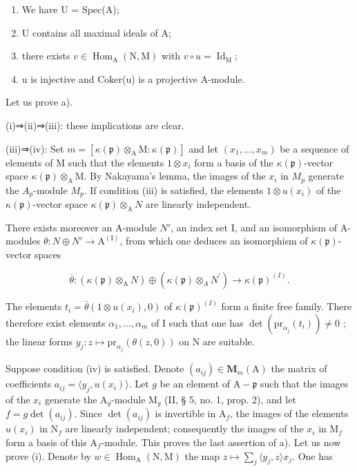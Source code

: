 \begin{enumerate}
\def\labelenumi{(\roman{enumi})}
\item
  We have U = Spec(A);
\item
  U contains all maximal ideals of A;
\item
  there exists \(v \in \operatorname{Hom}_{\mathrm{A}}(\mathrm{N}, \mathrm{M})\) with \(v \circ u = \operatorname{Id}_{\mathrm{M}}\);
\item
  u is injective and Coker(u) is a projective A-module.
\end{enumerate}

Let us prove a).

(i)⇒(ii)⇒(iii): these implications are clear.

(iii)⇒(iv): Set \(m = [\kappa(\mathfrak{p}) \otimes_{\mathrm{A}} \mathrm{M} : \kappa(\mathfrak{p})]\) and let \((x_{1}, \ldots, x_{m})\) be a sequence of elements of M such that the elements \(1 \otimes x_{i}\) form a basis of the \(\kappa(\mathfrak{p})\)-vector space \(\kappa(\mathfrak{p}) \otimes_{\mathrm{A}} \mathrm{M}\). By Nakayama's lemma, the images of the \(x_{i}\) in \(M_{p}\) generate the \(A_{p}\)-module \(M_{p}\). If condition (iii) is satisfied, the elements \(1 \otimes u(x_{i})\) of the \(\kappa(\mathfrak{p})\)-vector space \(\kappa(\mathfrak{p}) \otimes_{\mathrm{A}} N\) are linearly independent.

There exists moreover an A-module \(N'\), an index set I, and an isomorphism of A-modules \(\theta : N \oplus N' \to \mathrm{A}^{(\mathrm{I})}\), from which one deduces an isomorphism of \(\kappa(\mathfrak{p})\)-vector spaces

\[
\overline {{{\theta}}}: (\kappa (\mathfrak {p}) \otimes_ {\mathrm{A}} N) \oplus (\kappa (\mathfrak {p}) \otimes_ {A} N ^ {\prime}) \rightarrow \kappa (\mathfrak {p}) ^ {(I)}.
\]

The elements \(t_i = \bar{\theta}(1 \otimes u(x_i), 0)\) of \(\kappa(\mathfrak{p})^{(I)}\) form a finite free family. There therefore exist elements \(\alpha_1, \ldots, \alpha_{m}\) of I such that one has \(\det(\mathrm{pr}_{\alpha_j}(t_i)) \neq 0\) ; the linear forms \(y_j : z \mapsto \mathrm{pr}_{\alpha_j}(\theta(z, 0))\) on N are suitable.

Suppose condition (iv) is satisfied. Denote \((a_{ij}) \in \mathbf{M}_m(\mathrm{A})\) the matrix of coefficients \(a_{ij} = \langle y_j, u(x_i)\rangle\). Let \(g\) be an element of \(\mathrm{A} - \mathfrak{p}\) such that the images of the \(x_i\) generate the \(\mathrm{A}_g\)-module \(\mathrm{M}_g\) (II, § 5, no. 1, prop. 2), and let \(f = g \det(a_{ij})\). Since \(\det(a_{ij})\) is invertible in \(\mathrm{A}_f\), the images of the elements \(u(x_i)\) in \(\mathrm{N}_f\) are linearly independent; consequently the images of the \(x_i\) in \(\mathrm{M}_f\) form a basis of this \(\mathrm{A}_f\)-module. This proves the last assertion of a). Let us now prove (i). Denote by \(w \in \operatorname{Hom}_{\mathrm{A}}(\mathrm{N}, \mathrm{M})\) the map \(z \mapsto \sum_{j} \langle y_j, z\rangle x_j\). One has

